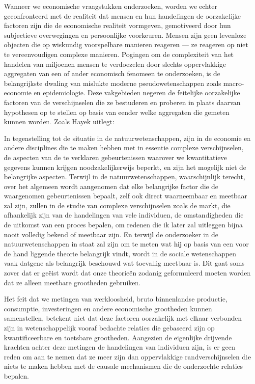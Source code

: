 Wanneer we economische vraagstukken onderzoeken, worden we echter geconfronteerd met de realiteit dat mensen en hun handelingen de oorzakelijke factoren zijn die de economische realiteit vormgeven, gemotiveerd door hun subjectieve overwegingen en persoonlijke voorkeuren. Mensen zijn geen levenloze objecten die op wiskundig voorspelbare manieren reageren --- ze reageren op niet te vereenvoudigen complexe manieren. Pogingen om de complexiteit van het handelen van miljoenen mensen te verdoezelen door slechts oppervlakkige aggregaten van een of ander economisch fenomeen te onderzoeken, is de belangrijkste dwaling van mislukte moderne pseudowetenschappen zoals macro-economie en epidemiologie. Deze vakgebieden negeren de feitelijke oorzakelijke factoren van de verschijnselen die ze bestuderen en proberen in plaats daarvan hypothesen op te stellen op basis van eender welke aggregaten die gemeten kunnen worden. Zoals Hayek uitlegt:

\begin{blockquotebox}
    In tegenstelling tot de situatie in de natuurwetenschappen, zijn in de economie en andere disciplines die te maken hebben met in essentie complexe verschijnselen, de aspecten van de te verklaren gebeurtenissen waarover we kwantitatieve gegevens kunnen krijgen noodzakelijkerwijs beperkt, en zijn het mogelijk niet de belangrijke aspecten. Terwijl in de natuurwetenschappen, waarschijnlijk terecht, over het algemeen wordt aangenomen dat elke belangrijke factor die de waargenomen gebeurtenissen bepaalt, zelf ook direct waarneembaar en meetbaar zal zijn, zullen in de studie van complexe verschijnselen zoals de markt, die afhankelijk zijn van de handelingen van vele individuen, de omstandigheden die de uitkomst van een proces bepalen, om redenen die ik later zal uitleggen bijna nooit volledig bekend of meetbaar zijn. En terwijl  de onderzoeker in de natuurwetenschappen in staat zal zijn om te meten wat hij op basis van een voor de hand liggende theorie belangrijk vindt, wordt in de sociale wetenschappen vaak datgene als belangrijk beschouwd wat toevallig meetbaar is. Dit gaat soms zover dat er geëist wordt dat onze theorieën zodanig geformuleerd moeten worden dat ze alleen meetbare grootheden gebruiken.\footnotemark
\end{blockquotebox}
\autocite{9}


Het feit dat we metingen van werkloosheid, bruto binnenlandse productie, consumptie, investeringen en andere economische grootheden kunnen samenstellen, betekent niet dat deze factoren oorzakelijk met elkaar verbonden zijn in wetenschappelijk vooraf bedachte relaties die gebaseerd zijn op kwantificeerbare en toetsbare grootheden. Aangezien de eigenlijke drijvende krachten achter deze metingen de handelingen van individuen zijn, is er geen reden om aan te nemen dat ze meer zijn dan oppervlakkige randverschijnselen die niets te maken hebben met de causale mechanismen die de onderzochte relaties bepalen.

